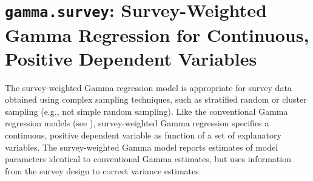 

 

\section{{\tt gamma.survey}: Survey-Weighted Gamma Regression for Continuous, Positive Dependent Variables}
\label{gamma.survey}

The survey-weighted Gamma regression model is appropriate for 
survey data obtained using complex sampling techniques, such as 
stratified random or cluster sampling (e.g., not simple random 
sampling).  Like the conventional Gamma regression models (see 
), survey-weighted Gamma regression specifies a 
continuous, positive dependent variable as function of a set of explanatory 
variables.  The survey-weighted Gamma model reports estimates of 
model parameters identical to conventional Gamma estimates, but uses 
information from the survey design to correct variance estimates.

